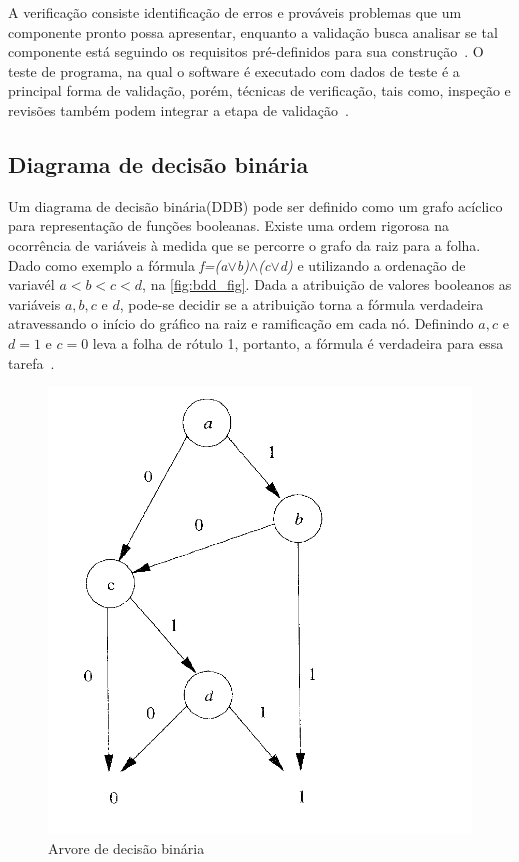 \par
A verificação consiste identificação de erros e prováveis problemas que um componente pronto possa apresentar, enquanto a validação busca analisar se tal componente está seguindo os requisitos pré-definidos para sua construção~\cite{koscianski2007qualidade}. O teste de programa, na qual o software  é executado com dados de teste é a principal forma de validação, porém, técnicas de verificação, tais como, inspeção e revisões também podem integrar a etapa de validação~\cite{sommerville2011engenharia}.

\subsection{Diagrama de decisão binária}
Um diagrama de decisão binária(DDB) pode ser definido como um grafo acíclico para representação de funções booleanas. Existe uma ordem rigorosa na ocorrência de variáveis à medida que se percorre o grafo da raiz para a folha. Dado como exemplo a fórmula \textit{f=(a$\lor$b)$\land$(c$\lor$d)} e utilizando a ordenação de variavél $a < b < c < d$, na \autoref{fig:bdd_fig}. Dada a atribuição de valores booleanos as variáveis $a, b, c$ e $d$, pode-se decidir se a atribuição torna a fórmula verdadeira atravessando o início do gráfico na raiz e ramificação em cada nó. Definindo $a,c$ e $d = 1$ e $c = 0$ leva a folha de rótulo 1, portanto, a fórmula é verdadeira para essa tarefa~\cite{clarke1994model}.


\begin{figure}[H]
	\begin{center}
    \caption{\label{fig:bdd_fig}Arvore de decisão binária}
	\includegraphics[scale=0.30]{Figuras/Arvore_BDD.png}
	\end{center}
\end{figure}

